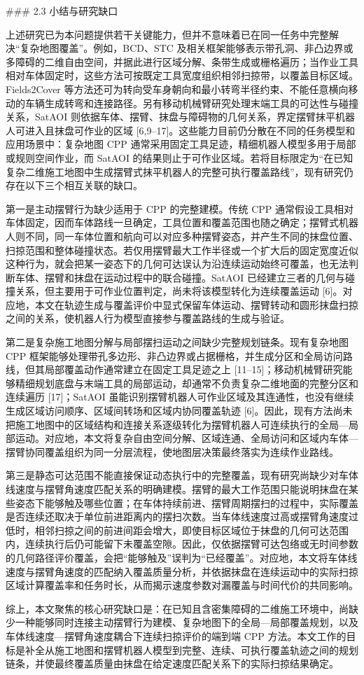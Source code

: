   

### 2.3 小结与研究缺口

  

上述研究已为本问题提供若干关键能力，但并不意味着已在同一任务中完整解决“复杂地图覆盖”。例如，BCD、STC 及相关框架能够表示带孔洞、非凸边界或多障碍的二维自由空间，并据此进行区域分解、条带生成或栅格遍历；当作业工具相对车体固定时，这些方法可按既定工具宽度组织相邻扫掠带，以覆盖目标区域。Fields2Cover 等方法还可为转向受车身朝向和最小转弯半径约束、不能任意横向移动的车辆生成转弯和连接路径。另有移动机械臂研究处理末端工具的可达性与碰撞关系，SatAOI 则依据车体、摆臂、抹盘与障碍物的几何关系，界定摆臂抹平机器人可进入且抹盘可作业的区域 [6,9–17]。这些能力目前仍分散在不同的任务模型和应用场景中：复杂地图 CPP 通常采用固定工具足迹，精细机器人模型多用于局部或规则空间作业，而 SatAOI 的结果则止于可作业区域。若将目标限定为“在已知复杂二维施工地图中生成摆臂式抹平机器人的完整可执行覆盖路线”，现有研究仍存在以下三个相互关联的缺口。

  

第一是主动摆臂行为缺少适用于 CPP 的完整建模。传统 CPP 通常假设工具相对车体固定，因而车体路线一旦确定，工具位置和覆盖范围也随之确定；摆臂式机器人则不同，同一车体位置和航向可以对应多种摆臂姿态，并产生不同的抹盘位置、扫掠范围和整体碰撞状态。若仅用摆臂最大工作半径或一个扩大后的固定宽度近似这种行为，就会把某一姿态下的几何可达误认为沿连续运动始终可覆盖，也无法判断车体、摆臂和抹盘在运动过程中的联合碰撞。SatAOI 已经建立三者的几何与碰撞关系，但主要用于可作业位置判定，尚未将该模型转化为连续覆盖运动 [6]。对应地，本文在轨迹生成与覆盖评价中显式保留车体运动、摆臂转动和圆形抹盘扫掠之间的关系，使机器人行为模型直接参与覆盖路线的生成与验证。

  

第二是复杂施工地图分解与局部摆扫运动之间缺少完整规划链条。现有复杂地图 CPP 框架能够处理带孔多边形、非凸边界或占据栅格，并生成分区和全局访问路线，但其局部覆盖动作通常建立在固定工具足迹之上 [11–15]；移动机械臂研究能够精细规划底盘与末端工具的局部运动，却通常不负责复杂二维地面的完整分区和连续遍历 [17]；SatAOI 虽能识别摆臂机器人可作业区域及其连通性，也没有继续生成区域访问顺序、区域间转场和区域内协同覆盖轨迹 [6]。因此，现有方法尚未把施工地图中的区域结构和连接关系逐级转化为摆臂机器人可连续执行的全局—局部运动。对应地，本文将复杂自由空间分解、区域连通、全局访问和区域内车体—摆臂协同覆盖组织为同一分层流程，使地图层决策最终落实为连续作业路线。

  

第三是静态可达范围不能直接保证动态执行中的完整覆盖，现有研究尚缺少对车体线速度与摆臂角速度匹配关系的明确建模。摆臂的最大工作范围只能说明抹盘在某些姿态下能够触及哪些位置；在车体持续前进、摆臂周期摆扫的过程中，实际覆盖是否连续还取决于单位前进距离内的摆扫次数。当车体线速度过高或摆臂角速度过低时，相邻扫掠之间的前进间距会增大，即使目标区域位于抹盘的几何可达范围内，连续执行后仍可能留下未覆盖空隙。因此，仅依据摆臂可达包络或无时间参数的几何路径评价覆盖，会把“能够触及”误判为“已经覆盖”。对应地，本文将车体线速度与摆臂角速度的匹配纳入覆盖质量分析，并依据抹盘在连续运动中的实际扫掠区域计算覆盖率和任务时长，从而揭示速度参数对漏覆盖与时间代价的共同影响。

  

综上，本文聚焦的核心研究缺口是：在已知且含密集障碍的二维施工环境中，尚缺少一种能够同时连接主动摆臂行为建模、复杂地图下的全局—局部覆盖规划，以及车体线速度—摆臂角速度耦合下连续扫掠评价的端到端 CPP 方法。本文工作的目标是补全从施工地图和摆臂机器人模型到完整、连续、可执行覆盖轨迹之间的规划链条，并使最终覆盖质量由抹盘在给定速度匹配关系下的实际扫掠结果确定。


